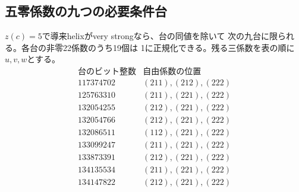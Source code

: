 \subsection{五零係数の九つの必要条件台}
\label{subsec:ou-five-zero-supports}

\begin{theorem}[五零係数の経路次元による制約]
\label{thm:ou-five-zero-path-exclusion}
$z(c)=5$で導来helixがvery strongなら、台の同値を除いて
次の九台に限られる。各台の非零22係数のうち19個は
1に正規化できる。残る三係数を表の順に$u,v,w$とする。
\[
\begin{array}{r|l}
\text{台のビット整数}&\text{自由係数の位置}\\ \hline
117374702&(211),(212),(222)\\
125763310&(211),(221),(222)\\
132054255&(212),(221),(222)\\
132054766&(212),(221),(222)\\
132086511&(112),(221),(222)\\
133099247&(211),(221),(222)\\
133873391&(212),(221),(222)\\
134135534&(211),(221),(222)\\
134147822&(212),(221),(222)
\end{array}
\]
\end{theorem}
